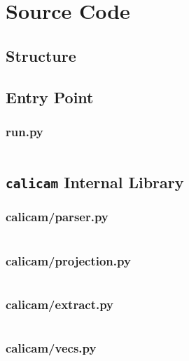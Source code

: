 \clearpage
\section{Source Code}

\subsection*{Structure}

\singlespacing

\subsection*{Entry Point} 
\subsubsection*{run.py} \label{code:run}
\inputminted{python}{./calicam/run.py}

\subsection*{\texttt{calicam} Internal Library}
\subsubsection*{calicam/parser.py} \label{code:parser}
\inputminted{python}{./calicam/calicam/parser.py}

\subsubsection*{calicam/projection.py} \label{code:projection}
\inputminted{python}{./calicam/calicam/projection.py}

\subsubsection*{calicam/extract.py} \label{code:extract}
\inputminted{python}{./calicam/calicam/extract.py}

\subsubsection*{calicam/vecs.py} \label{code:vecs}
\inputminted{python}{./calicam/calicam/vecs.py}

\onehalfspacing
